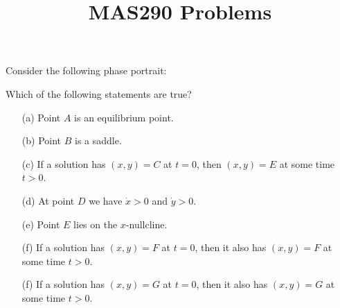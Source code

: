 \documentclass[a4paper]{amsart}
\title{MAS290 Problems}
\begin{document}
\maketitle

\begin{exercise}\label{ex-read-portrait}
 Consider the following phase portrait:
 \begin{center}
 \end{center}
 Which of the following statements are true?
 \begin{itemize}
  \item[(a)] Point $A$ is an equilibrium point.
  \item[(b)] Point $B$ is a saddle.
  \item[(c)] If a solution has $(x,y)=C$ at $t=0$, then $(x,y)=E$ at
   some time $t>0$.
  \item[(d)] At point $D$ we have $\dot{x}>0$ and $\dot{y}>0$.
  \item[(e)] Point $E$ lies on the $x$-nullcline.
  \item[(f)] If a solution has $(x,y)=F$ at $t=0$, then it also has
   $(x,y)=F$ at some time $t>0$.
  \item[(f)] If a solution has $(x,y)=G$ at $t=0$, then it also has
   $(x,y)=G$ at some time $t>0$.
 \end{itemize}
\end{exercise}
\end{document}
